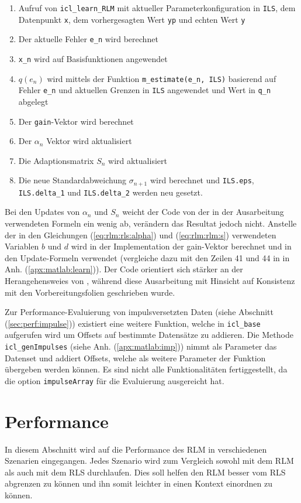 \documentclass[a4paper, 12pt]{article}
\begin{document}
{\begin{enumerate}\itemsep0pt \parskip0pt 
  \item Aufruf von \texttt{icl\_learn\_RLM} mit aktueller Parameterkonfiguration in \texttt{ILS}, dem Datenpunkt \texttt{x}, dem vorhergesagten Wert \texttt{yp} und echten Wert \texttt{y}
  \item Der aktuelle Fehler \texttt{e\_n} wird berechnet
  \item \texttt{x\_n} wird auf Basisfunktionen angewendet
  \item $q(e_n)$ wird mittels der Funktion \texttt{m\_estimate(e\_n, ILS)} basierend auf Fehler \texttt{e\_n} und aktuellen Grenzen in \texttt{ILS} angewendet und Wert in \texttt{q\_n} abgelegt
  \item Der \texttt{gain}-Vektor wird berechnet
  \item Der $\alpha_n$ Vektor wird aktualisiert
  \item Die Adaptionsmatrix $S_n$ wird aktualisiert
  \item Die neue Standardabweichung $\sigma_{n+1}$ wird berechnet und \texttt{ILS.eps}, \texttt{ILS.delta\_1} und \texttt{ILS.delta\_2} werden neu gesetzt.
\end{enumerate}
Bei den Updates von $\alpha_n$ und $S_n$ weicht der Code von der in der Ausarbeitung verwendeten Formeln ein wenig ab, verändern das Resultat jedoch nicht. Anstelle der in den Gleichungen (\ref{eq:rlm:rls:alpha}) und (\ref{eq:rlm:rlm:s}) verwendeten Variablen $b$ und $d$ wird in der Implementation der gain-Vektor berechnet und in den Update-Formeln verwendet (vergleiche dazu mit den Zeilen 41 und 44 in in Anh. (\ref{apx:matlab:learn})). Der Code orientiert sich stärker an der Herangehensweies von \cite{zou2000recursive}, während diese Ausarbeitung mit Hinsicht auf Konsistenz mit den Vorbereitungsfolien geschrieben wurde.

Zur Performance-Evaluierung von impulsversetzten Daten (siehe Abschnitt (\ref{sec:perf:impulse})) existiert eine weitere Funktion, welche in \texttt{icl\_base} aufgerufen wird um Offsets auf bestimmte Datensätze zu addieren. Die Methode \texttt{icl\_genImpulses} (siehe Anh. (\ref{apx:matlab:imp})) nimmt als Parameter das Datenset und addiert Offsets, welche als weitere Parameter der Funktion übergeben werden können. Es sind nicht alle Funktionalitäten fertiggestellt, da die option \texttt{impulseArray} für die Evaluierung ausgereicht hat.

\section{Performance}
\label{sec:performance}
In diesem Abschnitt wird auf die Performance des RLM in verschiedenen Szenarien eingegangen. Jedes Szenario wird zum Vergleich sowohl mit dem RLM als auch mit dem RLS durchlaufen. Dies soll helfen den RLM besser vom RLS abgrenzen zu können und ihn somit leichter in einen Kontext einordnen zu können. 

}
\end{document}
